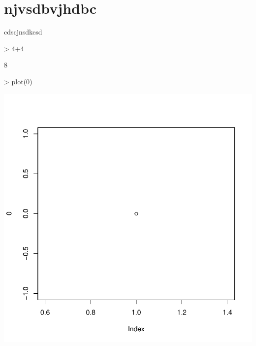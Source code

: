 \documentclass{article}
\begin{document}


\tableofcontents

\section{njvsdbvjhdbc}

cdscjnsdkcsd

\begin{Schunk}
\begin{Sinput}
> 4+4
\end{Sinput}
\begin{Soutput}
[1] 8
\end{Soutput}
\end{Schunk}

\begin{Schunk}
\begin{Sinput}
> plot(0)
\end{Sinput}
\end{Schunk}
\includegraphics{ej3-002}
\end{document}
